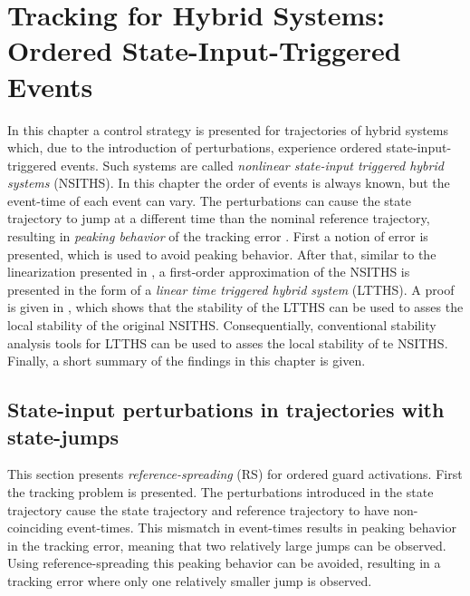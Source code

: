 \documentclass[../DC2017114Bouma.tex]{subfiles}
\begin{document}
\graphicspath{{03_Contribution/img/}}
\renewcommand{\chaptermark}[1]{\markboth{\thechapter.\ #1}{}}
\renewcommand{\sectionmark}[1]{\markright{#1}{}}

\pagestyle{fancyreport}
\cleartooddpage
\pagestyle{fancyreport}
\chapter{Tracking for Hybrid Systems: Ordered State-Input-Triggered Events}\label{ch:order}
In this chapter a control strategy is presented for trajectories of hybrid systems which, due to the introduction of perturbations, experience ordered state-input-triggered events. Such systems are called \textit{nonlinear state-input triggered hybrid systems} (NSITHS). In this chapter the order of events is always known, but the event-time of each event can vary. The perturbations can cause the state trajectory to jump at a different time than the nominal reference trajectory, resulting in \textit{peaking behavior} of the tracking error \cite{Menini2001,Biemond2013}. First a notion of error \cite{Rijnen2017} is presented, which is used to avoid peaking behavior. After that, similar to the linearization presented in \cite{Rijnen2017}, a first-order approximation of the NSITHS is presented in the form of a \textit{linear time triggered hybrid system} (LTTHS). A proof is given in \cite{Rijnen2017}, which shows that the stability of the LTTHS can be used to asses the local stability of the original NSITHS. Consequentially, conventional stability analysis tools for LTTHS can be used to asses the local stability of te NSITHS. Finally, a short summary of the findings in this chapter is given.

\section{State-input perturbations in trajectories with state-jumps}
This section presents \textit{reference-spreading} (RS) for ordered guard activations. First the tracking problem is presented. The perturbations introduced in the state trajectory cause the state trajectory and reference trajectory to have non-coinciding event-times. This mismatch in event-times results in peaking behavior in the tracking error, meaning that two relatively large jumps can be observed. Using reference-spreading this peaking behavior can be avoided, resulting in a tracking error where only one relatively smaller jump is observed.
\end{document}
